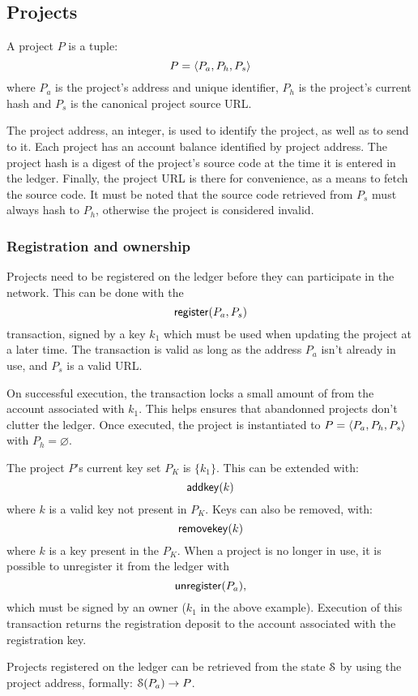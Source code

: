 \subsection{Projects}
\label{s:projects}

A project $P$ is a tuple:
\[
    P = \langle P_a, P_h, P_s\rangle
\]
where $P_{a}$ is the project's address and unique identifier, $P_h$ is
the project's current hash and $P_s$ is the canonical project source
URL.

The project address, an integer, is used to identify the project, as
well as to send \oscoin{} to it. Each project has an account balance
identified by project address. The project hash is a digest of the
project's source code at the time it is entered in the
ledger. Finally, the project URL is there for convenience, as a means
to fetch the source code.  It must be noted that the source code
retrieved from $P_s$ must always hash to $P_h$, otherwise the project
is considered invalid.

\subsubsection{Registration and ownership} Projects need to be
registered on the ledger before they can participate in the
network. This can be done with the
\[
    \mathsf{register}\lparen P_a, P_s\rparen
\]
transaction, signed by a key $k_1$ which must be used when updating the project
at a later time. The transaction is valid as long as the address $P_a$ isn't
already in use, and $P_s$ is a valid URL.

On successful execution, the transaction locks a small amount of \oscoin{} from
the account associated with $k_1$. This helps ensures that abandonned projects
don't clutter the ledger.  Once executed, the project is instantiated to $P =
\langle P_a, P_h, P_s\rangle$ with $P_h = \varnothing$.

The project $P$'s current key set $P_K$ is $\{k_1\}$. This can be extended
with:
\[
    \mathsf{addkey}\lparen k\rparen
\]
where $k$ is a valid key not present in $P_K$. Keys can also be removed, with:
\[
    \mathsf{removekey}\lparen k\rparen
\]
where $k$ is a key present in the $P_K$.
When a project is no longer in use, it is possible to unregister it from the
ledger with
\[
    \mathsf{unregister}\lparen P_a\rparen,
\]
which must be signed by an owner ($k_1$ in the above example).
Execution of this transaction returns the registration deposit to the account
associated with the registration key.

Projects registered on the ledger can be retrieved from the state $\mathcal{S}$ by
using the project address, formally: $\mathcal{S}(P_a) \to P$.

